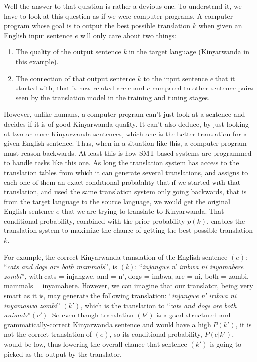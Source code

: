Well the answer to that question is rather a devious one. To understand it, we have to look at this question as if we were computer programs. A computer program whose goal is to output the best possible translation $k$ when given an English input sentence $e$ will only care about two things: 
\begin{enumerate}
\item The quality of the output sentence $k$ in the target language (Kinyarwanda in this example).
\item The connection of that output sentence $k$ to the input sentence $e$ that it started with, that is how related are $e$ and $e$ compared to other sentence pairs seen by the translation model in the training and tuning stages.
\end{enumerate}

However, unlike humans, a computer program can't just look at a sentence and decides if it is of good Kinyarwanda quality. It can't also deduce, by just looking at two or more Kinyarwanda sentences, which one is the better translation for a given English sentence. Thus, when in a situation like this, a computer program must reason backwards. At least this is how SMT-based systems are programmed to handle tasks like this one. As long the translation system has access to the translation tables from which it can generate several translations, and assigns to each one of them an exact conditional probability that if we started with that translation, and used the same translation system only going backwards, that is from the target language to the source language, we would get the original English sentence $e$ that we are trying to translate to Kinyarwanda. That conditional probability, combined with the prior probability $p(k)$, enables the translation system to maximize the chance of getting the best possible translation $k$.


For example, the correct Kinyarwanda translation of the English sentence $(e)$: ``\textit{cats and dogs are both mammals}'', is $(k)$: ``\textit{injangwe n' imbwa ni inyamabere zombi}'', with cats = injangwe, and = n', dogs = imbwa, are = ni, both = zombi, mammals = inyamabere. However, we can imagine that our translator, being very smart as it is, may generate the following translation: ``\textit{injangwe n' imbwa ni 
\underline{inyamaswa} zombi}'' $(k')$, which is the translation to ``\textit{cats and dogs are both \underline{animals}}''$(e')$. So even though translation $(k')$ is a good-structured and grammatically-correct Kinyarwanda sentence and would have a high $P(k')$, it is not the correct translation of $(e)$, so its conditional probability, $P(e|k')$, would be low, thus lowering the overall chance that sentence $(k')$ is going to picked as the output by the translator. 

